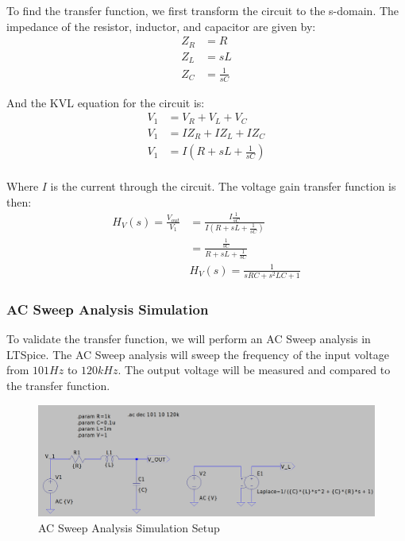 To find the transfer function, we first transform the circuit to the s-domain. The impedance of the resistor, inductor, and capacitor are given by:
\begin{align*}
    Z_{R} &= R \\
    Z_{L} &= sL \\
    Z_{C} &= \frac{1}{sC}
\end{align*}

And the KVL equation for the circuit is:
\begin{align*}
    V_{1} &= V_{R} + V_{L} + V_{C} \\
    V_{1} &= IZ_{R} + IZ_{L} + IZ_{C} \\
    V_{1} &= I(R + sL + \frac{1}{sC}) \\
\end{align*}

Where $I$ is the current through the circuit. The voltage gain transfer function is then:
\begin{align*}
    H_{V}(s) = \frac{V_{out}}{V_{1}} &= \frac{I\frac{1}{sC}}{I(R + sL + \frac{1}{sC})} \\
    &= \frac{\frac{1}{sC}}{R + sL + \frac{1}{sC}} \\
    &\boxed{H_{V}(s) = \frac{1}{sRC + s^{2}LC + 1}}
\end{align*}

\subsubsection{AC Sweep Analysis Simulation}
To validate the transfer function, we will perform an AC Sweep analysis in LTSpice. The AC Sweep analysis will sweep the frequency of the input voltage from $101Hz$ to $120kHz$. The output voltage will be measured and compared to the transfer function.

\begin{figure}[h]
    \centering
    \includegraphics[width=1\textwidth, height=0.3\textheight]{assets/rlc-sim.png}
    \caption{AC Sweep Analysis Simulation Setup}
    \label{fig:ac_sweep}
\end{figure}



